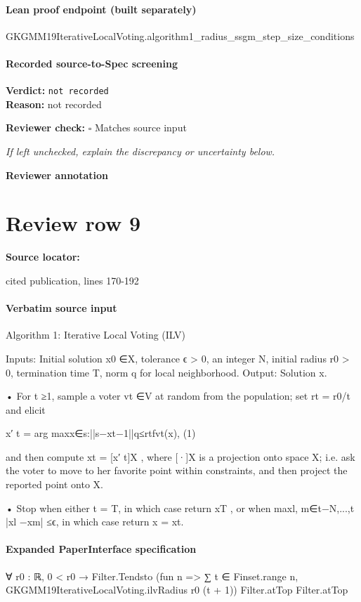 \documentclass[10pt]{article}
\newcommand{\reviewerbox}{%
  \par\noindent\fbox{\parbox{0.96\linewidth}{\rule{0pt}{0.38in}}}\par
}
\newcommand{\reviewmatch}[1]{%
  \par\noindent\textbf{Reviewer check:} $\square$\; #1\par
  \noindent\emph{If left unchecked, explain the discrepancy or uncertainty below.}\par
}
\begin{document}
\paragraph{Lean proof endpoint (built separately)}\begin{ReviewVerbatim}
GKGMM19IterativeLocalVoting.algorithm1_radius_ssgm_step_size_conditions
\end{ReviewVerbatim}

\paragraph{Recorded source-to-Spec screening}
\textbf{Verdict:} \texttt{not recorded}
\\
\textbf{Reason:} not recorded
\reviewmatch{Matches source input}
\noindent\textbf{Reviewer annotation}\par
\reviewerbox
\clearpage
\hypertarget{source-claim-ce6ed26ad4d98cd3}{}
\section*{Review row 9}
\textbf{Source locator:} {\footnotesize\raggedright cited publication, lines 170-\allowbreak{}192\par}
\paragraph{Verbatim source input}
\begin{ReviewVerbatim}
Algorithm 1: Iterative Local Voting (ILV)

Inputs:
Initial solution x0 ∈X, tolerance ϵ > 0, an integer N, initial radius r0 > 0,
termination time T, norm q for local neighborhood.
Output:
Solution x.

• For t ≥1, sample a voter vt ∈V at random from the population; set rt = r0/t
and elicit

x′
t = arg maxx∈{s:||s−xt−1||q≤rt}fvt(x),
(1)

and then compute xt = [x′
t]X , where [·]X is a projection onto space X; i.e. ask
the voter to move to her favorite point within constraints, and then project the
reported point onto X.

• Stop when either t = T, in which case return xT , or when
maxl, m∈{t−N,...,t} |xl −xm| ≤ϵ, in which case return x = xt.
\end{ReviewVerbatim}


\paragraph{Expanded PaperInterface specification}
\begin{ReviewVerbatim}
∀ {r0 : ℝ},
  0 < r0 →
    Filter.Tendsto (fun n => ∑ t ∈ Finset.range n, GKGMM19IterativeLocalVoting.ilvRadius r0 (t + 1)) Filter.atTop
      Filter.atTop
\end{ReviewVerbatim}
\end{document}
